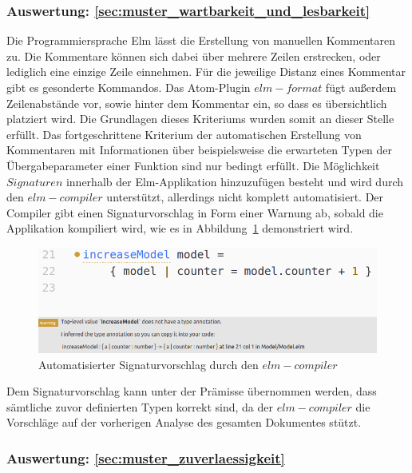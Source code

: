 \subsubsection{Auswertung: \ref{sec:muster_wartbarkeit_und_lesbarkeit} }
Die Programmiersprache Elm lässt die Erstellung von manuellen Kommentaren zu. Die Kommentare können sich dabei über mehrere Zeilen erstrecken, oder lediglich eine einzige Zeile einnehmen. Für die jeweilige Distanz eines Kommentar gibt es gesonderte Kommandos. Das Atom-Plugin $elm-format$ fügt außerdem Zeilenabstände vor, sowie hinter dem Kommentar ein, so dass es übersichtlich platziert wird. Die Grundlagen dieses Kriteriums wurden somit an dieser Stelle erfüllt. Das fortgeschrittene Kriterium der automatischen Erstellung von Kommentaren mit Informationen über beispielsweise die erwarteten Typen der Übergabeparameter einer Funktion sind nur bedingt erfüllt. Die Möglichkeit $Signaturen$ innerhalb der Elm-Applikation hinzuzufügen besteht und wird durch den $elm-compiler$ unterstützt, allerdings nicht komplett automatisiert. Der Compiler gibt einen Signaturvorschlag in Form einer Warnung ab, sobald die Applikation kompiliert wird, wie es in Abbildung~\ref{fig:compiler-signature-suggestion} demonstriert wird.
\begin{figure}[h]
\centering
\includegraphics[scale=0.52]{img/compiler_sig_suggestion.png}
\caption{Automatisierter Signaturvorschlag durch den $elm-compiler$}\label{fig:compiler-signature-suggestion}
\end{figure}
Dem Signaturvorschlag kann unter der Prämisse übernommen werden, dass sämtliche zuvor definierten Typen korrekt sind, da der $elm-compiler$ die Vorschläge auf der vorherigen Analyse des gesamten Dokumentes stützt.

\subsubsection{Auswertung: \ref{sec:muster_zuverlaessigkeit} }

